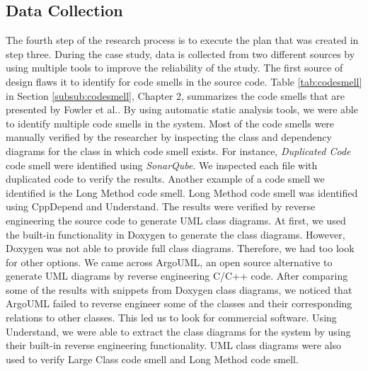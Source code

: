 \subsection{Data Collection}
The fourth step of the research process is to execute the plan that was created in step three. During the case study, data is collected from two different sources by using multiple tools to improve the reliability of the study. The first source of design flaws it to identify for code smells in the source code. Table \ref{tab:codesmell} in Section \ref{subsub:codesmell}, Chapter 2, summarizes the code smells that are presented by Fowler et al.\cite{fowler1999refactoring}. By using automatic static analysis tools, we were able to identify multiple code smells in the system. Most of the code smells were manually verified by the researcher by inspecting the class and dependency diagrams for the class in which code smell exists. For instance, \textit{Duplicated Code} code smell were identified using \textit{SonarQube}. We inspected each file with duplicated code to verify the results. Another example of a code smell we identified is the Long Method code smell. Long Method code smell was identified using CppDepend and Understand. The results were verified by reverse engineering the source code to generate UML class diagrams. At first, we used the built-in functionality in Doxygen to generate the class diagrams. However, Doxygen was not able to provide full class diagrams. Therefore, we had too look for other options. We came across ArgoUML, an open source alternative to generate UML diagrams by reverse engineering C/C++ code. After comparing some of the results with snippets from Doxygen class diagrams, we noticed that ArgoUML failed to reverse engineer some of the classes and their corresponding relations to other classes. This led us to look for commercial software. Using Understand, we were able to extract the class diagrams for the system by using their built-in reverse engineering functionality. UML class diagrams were also used to verify Large Class code smell and Long Method code smell.

